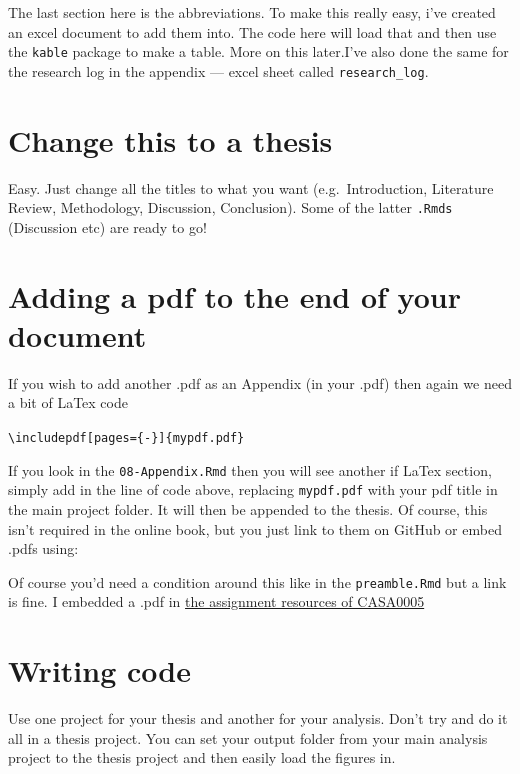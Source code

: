 \documentclass[
  12pt,
  oneside]{book}
\begin{document}
The last section here is the abbreviations. To make this really easy, i've created an excel document to add them into. The code here will load that and then use the \texttt{kable} package to make a table. More on this later.I've also done the same for the research log in the appendix --- excel sheet called \texttt{research\_log}.

\hypertarget{change-this-to-a-thesis}{%
\section{Change this to a thesis}\label{change-this-to-a-thesis}}

Easy. Just change all the titles to what you want (e.g.~Introduction, Literature Review, Methodology, Discussion, Conclusion). Some of the latter \texttt{.Rmds} (Discussion etc) are ready to go!

\hypertarget{adding-a-pdf-to-the-end-of-your-document}{%
\section{Adding a pdf to the end of your document}\label{adding-a-pdf-to-the-end-of-your-document}}

If you wish to add another .pdf as an Appendix (in your .pdf) then again we need a bit of LaTex code

\texttt{\textbackslash{}includepdf{[}pages=\{-\}{]}\{mypdf.pdf\}}

If you look in the \texttt{08-Appendix.Rmd} then you will see another if LaTex section, simply add in the line of code above, replacing \texttt{mypdf.pdf} with your pdf title in the main project folder. It will then be appended to the thesis. Of course, this isn't required in the online book, but you just link to them on GitHub or embed .pdfs using:

Of course you'd need a condition around this like in the \texttt{preamble.Rmd} but a link is fine. I embedded a .pdf in \href{https://andrewmaclachlan.github.io/CASA0005repo/assignment-resources-1.html}{the assignment resources of CASA0005}

\hypertarget{writing-code}{%
\section{Writing code}\label{writing-code}}

Use one project for your thesis and another for your analysis. Don't try and do it all in a thesis project. You can set your output folder from your main analysis project to the thesis project and then easily load the figures in.
\end{document}
